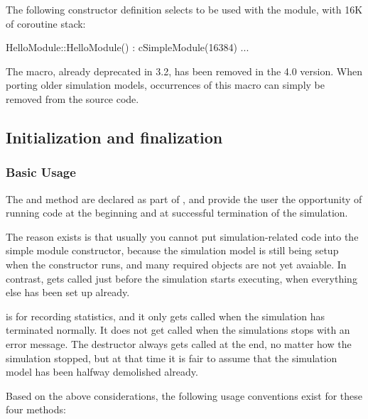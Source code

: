 The following constructor definition selects  to be used
with the module, with 16K of coroutine stack:

\begin{cpp}
HelloModule::HelloModule() : cSimpleModule(16384) {...}
\end{cpp}

\begin{note}
    The  macro, already deprecated in {\opp} 3.2,
    has been removed in the 4.0 version. When porting older simulation models,
    occurrences of this macro can simply be removed from the source code.
\end{note}


\subsection{Initialization and finalization}
\label{sec:simple-modules:initialize-and-finish}

\subsubsection{Basic Usage}

The  and  method are declared
as part of , and provide the user the opportunity
of running code at the beginning and at successful termination of the
simulation.

The reason  exists is that usually you cannot put
simulation-related code into the simple module
constructor, because the simulation model is still
being setup when the constructor runs, and many required objects are not yet
avaiable. In contrast,  gets called just before the
simulation starts executing, when everything else has been set up
already.

 is for recording statistics, and it only gets called
when the simulation has terminated normally. It does not get called when
the simulations stops with an error message. The destructor always
gets called at the end, no matter how the simulation stopped, but
at that time it is fair to assume that the simulation model has been
halfway demolished already.

Based on the above considerations, the following usage conventions exist
for these four methods:

